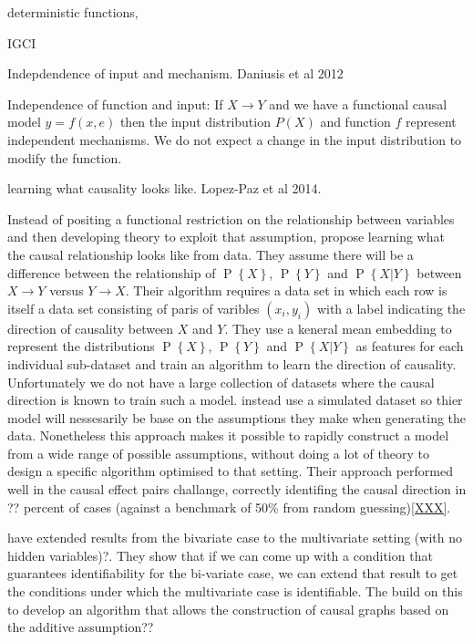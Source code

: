 \documentclass[11pt,a4paper,oneside]{book}
\renewcommand{\P}[1]{\operatorname{P}\left\{#1\right\}}
\begin{document}
deterministic functions,

IGCI \cite{Janzing2012a}

Indepdendence of input and mechanism. Daniusis et al 2012

Independence of function and input: If $X \rightarrow Y$ and we have a functional causal model $y = f(x,e)$ then the input
distribution $P(X)$ and function $f$ represent independent mechanisms. We do not expect a change in the input distribution to modify the function. 

learning what causality looks like.
Lopez-Paz et al 2014. 

 
Instead of positing a functional restriction on the relationship between variables and then developing theory to exploit that assumption, \citep{LopezPaz2014} propose learning what the causal relationship looks like from data. They assume there will be a difference between the relationship of $\P{X}$, $\P{Y}$ and $\P{X|Y}$ between $X \rightarrow Y$ versus $Y \rightarrow X$. Their algorithm requires a data set in which each row is itself a data set consisting of paris of varibles $(x_i,y_i)$ with a label indicating the direction of causality between $X$ and $Y$. They use a keneral mean embedding to represent the distributions $\P{X}$, $\P{Y}$ and $\P{X|Y}$ as features for each individual sub-dataset and train an algorithm to learn the direction of causality. Unfortunately we do not have a large collection of datasets where the causal direction is known to train such a model. \citep{LopezPaz2014} instead use a simulated dataset so thier model will nessesarily be base on the assumptions they make when generating the data. Nonetheless this approach makes it possible to rapidly construct a model from a wide range of possible assumptions, without doing a lot of theory to design a specific algorithm optimised to that setting. Their approach performed well in the causal effect pairs challange, correctly identifing the causal direction in ?? percent of cases (against a benchmark of 50\% from random guessing)\ref{XXX}.


\citep{Peters2014} have extended results from the bivariate case to the multivariate setting (with no hidden variables)?. They show that if we can come up with a condition that guarantees identifiability for the bi-variate case, we can extend that result to get the conditions under which the multivariate case is identifiable. The build on this to develop an algorithm that allows the construction of causal graphs based on the additive assumption??
\end{document}
